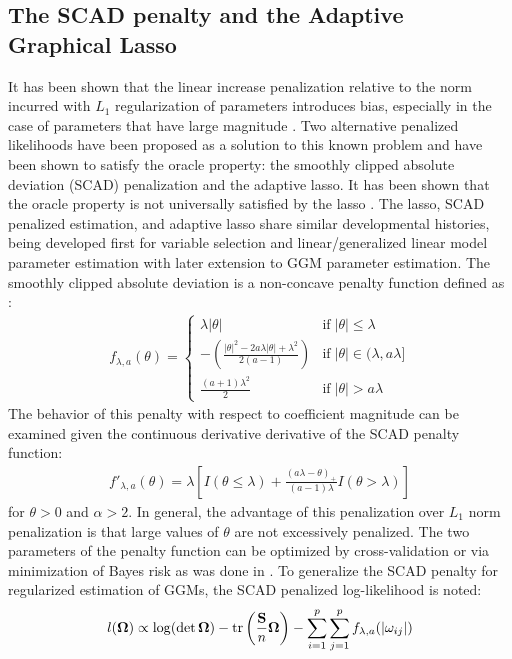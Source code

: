 \begin{DoubleSpace*}
\subsection{The SCAD penalty and the Adaptive Graphical Lasso}
It has been shown that the linear increase penalization relative to the norm incurred with $L_1$ regularization of parameters introduces bias, especially in the case of parameters that have large magnitude \cite{fan2009,lam2009}. Two alternative penalized likelihoods have been proposed as a solution to this known problem and have been shown to satisfy the oracle property: the smoothly clipped absolute deviation (SCAD) penalization and the adaptive lasso. It has been shown that the oracle property is not universally satisfied by the lasso \cite{zou2006}. The lasso, SCAD penalized estimation, and adaptive lasso share similar developmental histories, being developed first for variable selection and linear/generalized linear model parameter estimation with later extension to GGM parameter estimation. The smoothly clipped absolute deviation is a non-concave penalty function defined as \cite{fan2001}:
\begin{align}
f_{\lambda,a}(\theta)=
\begin{cases} 
\lambda |\theta| & \text{if} \; |\theta|\leq \lambda \\
-\left(\frac{|\theta|^2 -2a \lambda |\theta|+\lambda^2}{2(a-1)}\right)& \text{if}\; |\theta| \in (\lambda,a \lambda] \\
\frac{(a+1)\lambda^2}{2} & \text{if} \; |\theta|>a \lambda 
\end{cases}
\end{align}
The behavior of this penalty with respect to coefficient magnitude can be examined given the continuous derivative derivative of the SCAD penalty function:
\begin{align}
f'_{\lambda,a}(\theta)=\lambda \left[I(\theta \leq \lambda) + \frac{(a \lambda-\theta)_+}{(a-1)\lambda}I(\theta>\lambda)\right]
\end{align}
for $\theta > 0$ and $\alpha>2$. In general, the advantage of this penalization over $L_1$ norm penalization is that large values of $\theta$ are not excessively penalized. The two parameters of the penalty function can be optimized by cross-validation or via minimization of Bayes risk as was done in \cite{fan2001}. To generalize the SCAD penalty for regularized estimation of GGMs, the SCAD penalized log-likelihood is noted:
\begin{align*}
l(\boldsymbol{\Omega}) \propto \log(\det \boldsymbol{\Omega})-\operatorname{tr} \left(\frac{\textbf{S}}{n} \boldsymbol{\Omega} \right) - \sum_{i=1}^{p} \sum_{j=1}^{p} f_{\lambda,a} (|\omega_{ij}|)
\end{align*}


\end{DoubleSpace*}
